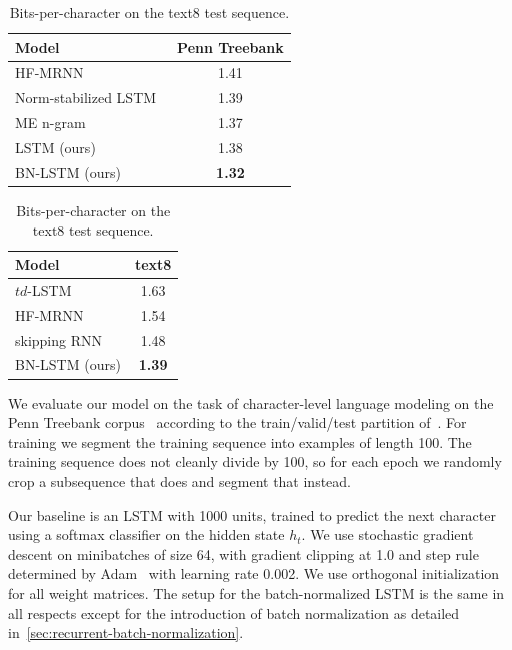 \documentclass{article} %
\begin{document}
\begin{table}
  \center
\begin{minipage}[t]{6.5cm}
\begin{tabular}{@{}lc@{}}
  \toprule
  \bf Model & \bf Penn Treebank \\
  \midrule
  HF-MRNN~\cite{mikolov2012subword} & 1.41 \\
  Norm-stabilized LSTM~\cite{krueger} & 1.39 \\
  ME n-gram~\cite{mikolov2012subword} & 1.37 \\
  \midrule
  LSTM (ours) & 1.38 \\
  BN-LSTM (ours) & \textbf{1.32} \\
  \bottomrule
\end{tabular}
\caption{Bits-per-character on the Penn Treebank test sequence.}
\label{tab:ptb_test}
\end{minipage}
\hspace{1cm}
\begin{minipage}[t]{4.5cm}
  \begin{tabular}{@{}lc@{}}
  \toprule
  \bf Model & \bf text8 \\
  \midrule
  $td$-LSTM~\cite{zhang2016architectural} & 1.63 \\
  HF-MRNN~\cite{mikolov2012subword} & 1.54 \\
  skipping RNN~\cite{pachitariu2013regularization} & 1.48 \\
  \midrule
  BN-LSTM (ours) & \textbf{1.39} \\
  \bottomrule
\end{tabular}
\caption{Bits-per-character on the text8 test sequence.}
\label{tab:text8_test}
\end{minipage}
\end{table}


We evaluate our model on the task of character-level language modeling on the Penn Treebank corpus~\cite{penntreebank}
according to the train/valid/test partition of~\cite{mikolov2012subword}.
For training we segment the training sequence into examples of length 100.
The training sequence does not cleanly divide by 100, so for each epoch we randomly crop a subsequence that does and segment that instead.

Our baseline is an LSTM with 1000 units, trained to predict the next character using a softmax classifier on the hidden state $h_t$.
We use stochastic gradient descent on minibatches of size 64,
with gradient clipping at 1.0 and step rule determined by Adam~\cite{kingma2014adam}
with learning rate 0.002.
We use orthogonal initialization for all weight matrices.
The setup for the batch-normalized LSTM is the same in all respects except for the introduction of batch normalization as detailed in~\ref{sec:recurrent-batch-normalization}.
\end{document}
